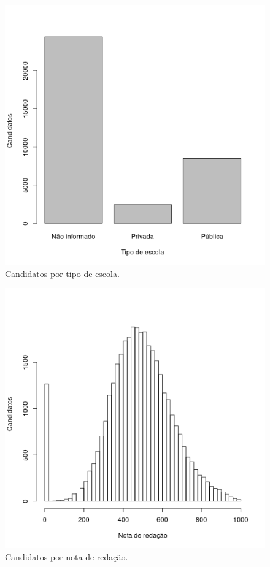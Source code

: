 \documentclass[12pt]{article}
\begin{document}
\begin{minipage}{.5\textwidth}
    \begin{figure}[H]
    \includegraphics[width=\linewidth]{../geral_candidatos-por-escola.png}
    \caption{Candidatos por tipo de escola.}
    \label{fig:candidatos-por-escola}
    \end{figure}
\end{minipage}%
\begin{minipage}{.5\textwidth}
\begin{figure}[H]
\centering\includegraphics[width=\linewidth]{../geral_candidatos-por-nota.png}
\caption{Candidatos por nota de redação.}
\label{fig:candidatos-por-nota}
\end{figure}
\end{minipage}
\end{document}
